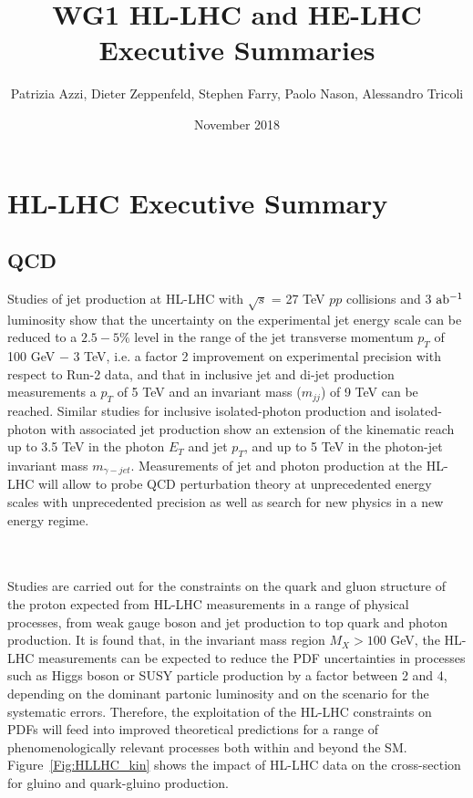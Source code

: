 \documentclass{article}
\title{WG1 HL-LHC and HE-LHC Executive Summaries}
\author{Patrizia Azzi, Dieter Zeppenfeld, Stephen Farry, Paolo Nason, Alessandro Tricoli }
\date{November 2018}
\begin{document}
\maketitle

\section{HL-LHC Executive Summary}


\subsection{QCD}

Studies of jet production at HL-LHC with $\sqrt{s}$ = 27 TeV $pp$ collisions and 3 ${\rm ab^{-1}}$ luminosity show that the uncertainty on the experimental jet energy scale can be reduced to a $2.5-5\%$ level in the range of the jet transverse momentum $p_T$ of 100 GeV $-$ 3 TeV, i.e. a factor 2 improvement on experimental precision with respect to Run-2 data, and that in inclusive jet and di-jet production measurements a $p_T$ of 5 TeV and an invariant mass ($m_{jj}$) of 9 TeV can be reached. Similar studies for inclusive isolated-photon production and isolated-photon with associated jet production show an extension of the kinematic reach up to 3.5 TeV in the photon $E_T$ and jet $p_T$, and up to 5 TeV in the photon-jet invariant mass $m_{\gamma - jet}$. Measurements of jet and photon production at the HL-LHC will allow to probe QCD perturbation theory at unprecedented energy scales with unprecedented precision as well as search for new physics in a new energy regime. 

\\
\\

Studies are carried out for the constraints on the quark and gluon structure of the proton expected from HL-LHC measurements in a range of physical
processes, from weak gauge boson and jet production to top quark and photon production. It is found that, in the invariant mass region $M_X > 100$ GeV, the HL-LHC measurements can be
expected to reduce the PDF uncertainties in processes such as Higgs boson or SUSY particle production
by a factor between 2 and 4, depending on the dominant partonic luminosity and on the scenario for the
systematic errors. Therefore, the exploitation of the HL-LHC constraints
on PDFs will feed into improved theoretical predictions for a range of phenomenologically relevant processes both within and beyond the SM. Figure~\ref{Fig:HLLHC_kin} shows the impact of HL-LHC data on the cross-section for gluino and quark-gluino production. 
\end{document}
